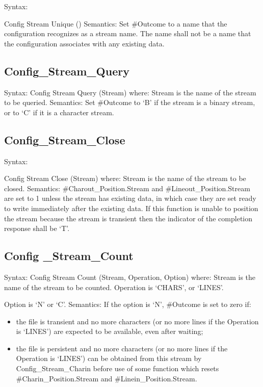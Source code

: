 Syntax:

Config Stream Unique () Semantics: Set \#Outcome to a name that the
configuration recognizes as a stream name. The name shall not be a name
that the configuration associates with any existing data.

\subsection{Config\_Stream\_Query}\label{config_stream_query}

Syntax: Config Stream Query (Stream) where: Stream is the name of the
stream to be queried. Semantics: Set \#Outcome to `B' if the stream is a
binary stream, or to `C' if it is a character stream.

\subsection{Config\_Stream\_Close}\label{config_stream_close}

Syntax:

Config Stream Close (Stream) where: Stream is the name of the stream to
be closed. Semantics: \#Charout\_Position.Stream and
\#Lineout\_Position.Stream are set to 1 unless the stream has existing
data, in which case they are set ready to write immediately after the
existing data. If this function is unable to position the stream because
the stream is transient then the indicator of the completion response
shall be `T'.

\subsection{Config \_Stream\_Count}\label{config-_stream_count}

Syntax: Config Stream Count (Stream, Operation, Option) where: Stream is
the name of the stream to be counted. Operation is `CHARS', or `LINES'.

Option is `N' or `C'. Semantics: If the option is `N', \#Outcome is set
to zero if:

\begin{itemize}
\item
  the file is transient and no more characters (or no more lines if the
  Operation is `LINES') are expected to be available, even after
  waiting;
\item
  the file is persistent and no more characters (or no more lines if the
  Operation is `LINES') can be obtained from this stream by
  Config\_Stream\_Charin before use of some function which resets
  \#Charin\_Position.Stream and \#Linein\_Position.Stream.
\end{itemize}


